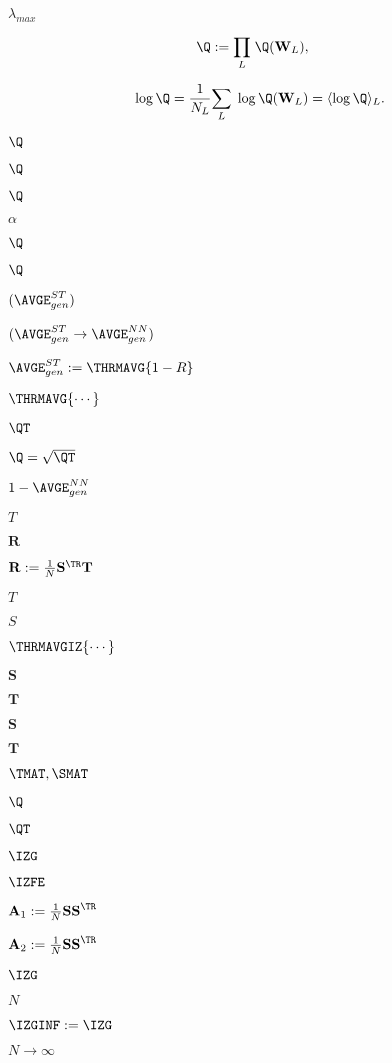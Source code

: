 $\lambda_{max}$

\begin{align}
\label{eqn:ProductNorm}
\Q&:=\underset{L}{\prod}\;\Q(\mathbf{W}_{L}) ,
\end{align}

\begin{align}
\label{eqn:LogProductNorm}
\log\Q=\frac{1}{N_{L}}\underset{L}{\sum}\;\log\Q(\mathbf{W}_{L})=\langle\log\Q\rangle_{L}  .
\end{align}


$\Q$

$\Q$

$\Q$

$\alpha$


$\Q$

$\Q$

$(\AVGE^{ST}_{gen})$

$(\AVGE^{ST}_{gen}\rightarrow\AVGE^{NN}_{gen})$

$\AVGE^{ST}_{gen}:=\THRMAVG{1-R}$

$\THRMAVG{\cdots}$

$\QT$

$\Q=\sqrt{\QT}$

$1-\AVGE^{NN}_{gen}$

$T$

$\mathbf{R}$

$\mathbf{R}:=\frac{1}{N}{\mathbf{S}^{\TR}\mathbf{T}}$

$T$

$S$

$\THRMAVGIZ{\cdots}$

$\mathbf{S}$

$\mathbf{T}$

$\mathbf{S}$

$\mathbf{T}$

$\TMAT, \SMAT$

$\Q$

$\QT$

$\IZG$

$\IZFE$

$\mathbf{A}_1:=\frac{1}{N}\mathbf{SS}^{\TR}$

$\mathbf{A}_2:=\frac{1}{N}\mathbf{SS}^{\TR}$

$\IZG$

$N$

$\IZGINF:=\IZG$

$N\rightarrow\infty$

